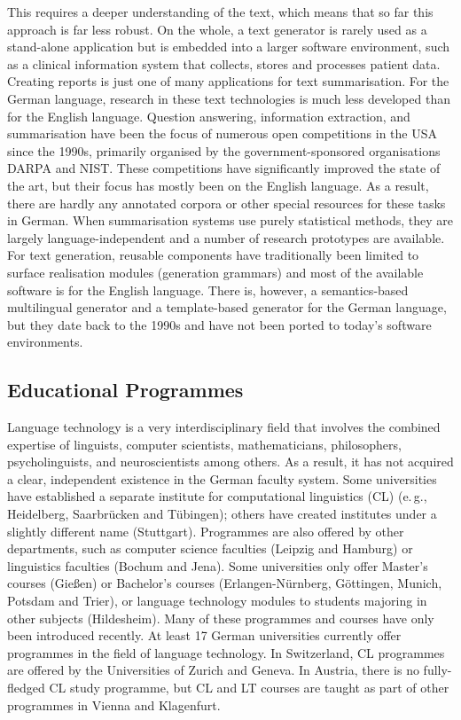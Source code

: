 \documentclass[]{../../metanetpaper}
\begin{document}
\begin{multicols}{2}

This requires a deeper understanding of the text, which means that so far this approach is far less robust. On the whole, a text generator is rarely used as a stand-alone application but is embedded into a larger software environment, such as a clinical information system that collects, stores and processes patient data. Creating reports is just one of many applications for text summarisation. 
For the German language, research in these text technologies is much less developed than for the English language. Question answering, information extraction, and summarisation have been the focus of numerous open competitions in the USA since the 1990s, primarily organised by the government-sponsored organisations DARPA and NIST. These competitions have significantly improved the state of the art, but their focus has mostly been on the English language. As a result, there are hardly any annotated corpora or other special resources for these tasks in German. When summarisation systems use purely statistical methods, they are largely language-independent and a number of research prototypes are available. For text generation, reusable components have traditionally been limited to surface realisation modules (generation grammars) and most of the available software is for the English language. There is, however, a semantics-based multilingual generator and a template-based generator for the German language, but they date back to the 1990s and have not been ported to today’s software environments.

\subsection{Educational Programmes}

Language technology is a very interdisciplinary field that involves the combined expertise of linguists, computer scientists, mathematicians, philosophers, psycholinguists, and neuroscientists among others. As a result, it has not acquired a clear, independent existence in the German faculty system. Some universities have established a separate institute for computational linguistics (CL) (e.\,g., Heidelberg, Saarbrücken and Tübingen); others have created institutes under a slightly different name (Stuttgart). Programmes are also offered by other departments, such as computer science faculties (Leipzig and Hamburg) or linguistics faculties (Bochum and Jena). Some universities only offer Master’s courses (Gießen) or Bachelor’s courses (Erlangen-Nürnberg, Göttingen, Munich, Potsdam and Trier), or language technology modules to students majoring in other subjects (Hildesheim). Many of these programmes and courses have only been introduced recently. At least 17 German universities currently offer programmes in the field of language technology. In Switzerland, CL programmes are offered by the Universities of Zurich and Geneva. In Austria, there is no fully-fledged CL study programme, but CL and LT courses are taught as part of other programmes in Vienna and Klagenfurt.


\end{multicols}
\end{document}
